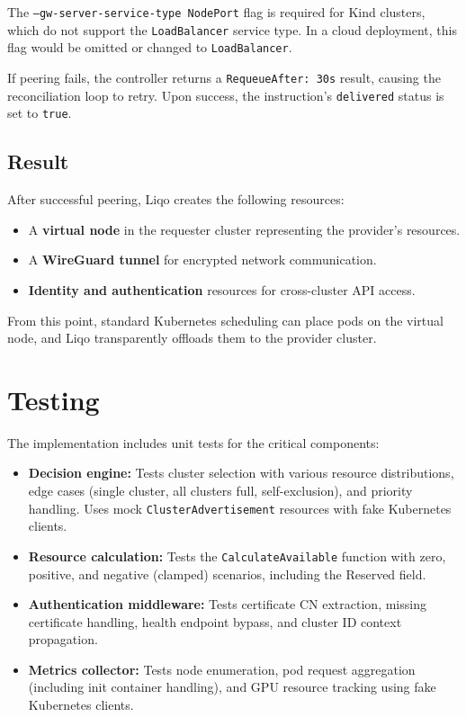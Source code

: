 The \texttt{--gw-server-service-type NodePort} flag is required for Kind clusters, which do not support the \texttt{LoadBalancer} service type. In a cloud deployment, this flag would be omitted or changed to \texttt{LoadBalancer}.

If peering fails, the controller returns a \texttt{RequeueAfter: 30s} result, causing the reconciliation loop to retry. Upon success, the instruction's \texttt{delivered} status is set to \texttt{true}.

\subsection{Result}

After successful peering, Liqo creates the following resources:
\begin{itemize}
    \item A \textbf{virtual node} in the requester cluster representing the provider's resources.
    \item A \textbf{WireGuard tunnel} for encrypted network communication.
    \item \textbf{Identity and authentication} resources for cross-cluster API access.
\end{itemize}

From this point, standard Kubernetes scheduling can place pods on the virtual node, and Liqo transparently offloads them to the provider cluster.


\section{Testing}
\label{sec:testing}

The implementation includes unit tests for the critical components:

\begin{itemize}
    \item \textbf{Decision engine:} Tests cluster selection with various resource distributions, edge cases (single cluster, all clusters full, self-exclusion), and priority handling. Uses mock \texttt{ClusterAdvertisement} resources with fake Kubernetes clients.

    \item \textbf{Resource calculation:} Tests the \texttt{CalculateAvailable} function with zero, positive, and negative (clamped) scenarios, including the Reserved field.

    \item \textbf{Authentication middleware:} Tests certificate CN extraction, missing certificate handling, health endpoint bypass, and cluster ID context propagation.

    \item \textbf{Metrics collector:} Tests node enumeration, pod request aggregation (including init container handling), and GPU resource tracking using fake Kubernetes clients.
\end{itemize}

